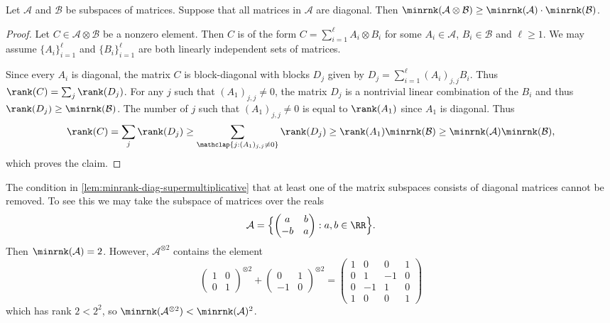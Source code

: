 %
%

\begin{lemma}\label{lem:minrank-diag-supermultiplicative}
    Let $\mathcal{A}$ and $\mathcal{B}$ be subspaces of matrices. Suppose that all matrices in $\mathcal{A}$ are diagonal.
    Then %
$\minrnk(\mathcal{A}\otimes\mathcal{B})\geq\minrnk(\mathcal{A})\cdot\minrnk(\mathcal{B})$.
\end{lemma}
%
\begin{proof}%
    Let $C\in\mathcal{A}\otimes\mathcal{B}$ be a nonzero element. Then $C$ is of the form $C =\sum_{i=1}^\ell A_i\otimes B_i$ for some $A_i \in \mathcal{A}$, $B_i \in \mathcal{B}$ and $\ell \geq 1$. We may assume $\{A_i\}_{i=1}^\ell$ and $\{B_i\}_{i=1}^\ell$ are both linearly independent sets of matrices.  %

    Since every $A_i$ is diagonal, the matrix $C$ is block-diagonal with blocks $D_j$ given by $D_j = \sum_{i=1}^\ell (A_i)_{j,j} B_i$. Thus $\rank(C) = \sum_j \rank(D_j)$. For any $j$ such that $(A_1)_{j,j} \neq 0$, the matrix $D_j$ is a nontrivial linear combination of the $B_i$ and thus $\rank(D_j) \geq \minrnk(\mathcal{B})$. The number of $j$ such that $(A_1)_{j,j} \neq0$ is equal to $\rank(A_1)$ since $A_1$ is diagonal. %
    Thus
    \[
    \rank(C) = \sum_j \rank(D_j) \geq \sum_{\mathclap{j: (A_1)_{j,j} \neq 0}} \rank(D_j) %
    \geq \rank(A_1)\minrnk(\mathcal{B}) \geq \minrnk(\mathcal{A})\minrnk(\mathcal{B}),
    \]
    which proves the claim. %
%
%
\end{proof}
%
\begin{example}\label{ex:minrank-not-supermultiplicative}
    The condition in \autoref{lem:minrank-diag-supermultiplicative} that at least one of the matrix subspaces consists of diagonal matrices cannot be removed. To see this we may take the subspace of matrices over the reals
    \[
\mathcal{A} = \Bigl\{\begin{pmatrix}
    a & b\\-b & a
\end{pmatrix} : a,b \in \RR\Bigr\}.
    \]
    Then $\minrnk(\mathcal{A}) = 2$. However, $\mathcal{A}^{\otimes 2}$ contains the element
    \[
    \begin{pmatrix}
        1 & 0\\0 & 1
    \end{pmatrix}^{\otimes 2}
    +
    \begin{pmatrix}
        0 & 1\\-1 & 0
    \end{pmatrix}^{\otimes 2}
     = \begin{pmatrix}
         1 & 0 & 0 & 1\\
         0 & 1 & -1 & 0\\
         0 & -1 & 1 & 0\\
         1 & 0 & 0 & 1
     \end{pmatrix}
    \]
    which has rank $2 < 2^2$, so $\minrnk(\mathcal{A}^{\otimes 2}) < \minrnk(\mathcal{A})^2$.
\end{example}


